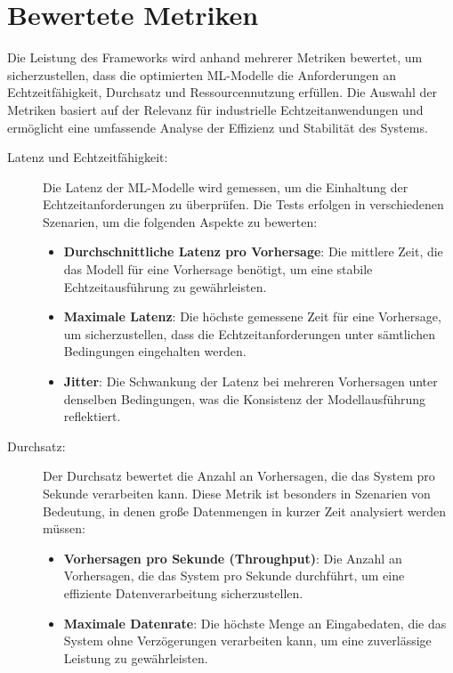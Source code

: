 \section{Bewertete Metriken}

Die Leistung des Frameworks wird anhand mehrerer Metriken bewertet, um sicherzustellen, dass die optimierten ML-Modelle die 
Anforderungen an Echtzeitfähigkeit, Durchsatz und Ressourcennutzung erfüllen. Die Auswahl der Metriken basiert auf der Relevanz 
für industrielle Echtzeitanwendungen und ermöglicht eine umfassende Analyse der Effizienz und Stabilität des Systems.

\begin{description}
    \item[Latenz und Echtzeitfähigkeit:] Die Latenz der ML-Modelle wird gemessen, um die Einhaltung der Echtzeitanforderungen 
    zu überprüfen. Die Tests erfolgen in verschiedenen Szenarien, um die folgenden Aspekte zu bewerten:
    \begin{itemize}
        \item \textbf{Durchschnittliche Latenz pro Vorhersage}: Die mittlere Zeit, die das Modell für eine Vorhersage benötigt, 
        um eine stabile Echtzeitausführung zu gewährleisten.
        \item \textbf{Maximale Latenz}: Die höchste gemessene Zeit für eine Vorhersage, um sicherzustellen, dass die Echtzeitanforderungen 
        unter sämtlichen Bedingungen eingehalten werden.
        \item \textbf{Jitter}: Die Schwankung der Latenz bei mehreren Vorhersagen unter denselben Bedingungen, 
        was die Konsistenz der Modellausführung reflektiert.
    \end{itemize}

    \item[Durchsatz:] Der Durchsatz bewertet die Anzahl an Vorhersagen, die das System pro Sekunde verarbeiten kann. 
    Diese Metrik ist besonders in Szenarien von Bedeutung, in denen große Datenmengen in kurzer Zeit analysiert werden müssen:
    \begin{itemize}
        \item \textbf{Vorhersagen pro Sekunde (Throughput)}: Die Anzahl an Vorhersagen, die das System pro Sekunde durchführt, 
        um eine effiziente Datenverarbeitung sicherzustellen.
        \item \textbf{Maximale Datenrate}: Die höchste Menge an Eingabedaten, die das System ohne Verzögerungen verarbeiten kann, 
        um eine zuverlässige Leistung zu gewährleisten.
    \end{itemize}


\end{description}
